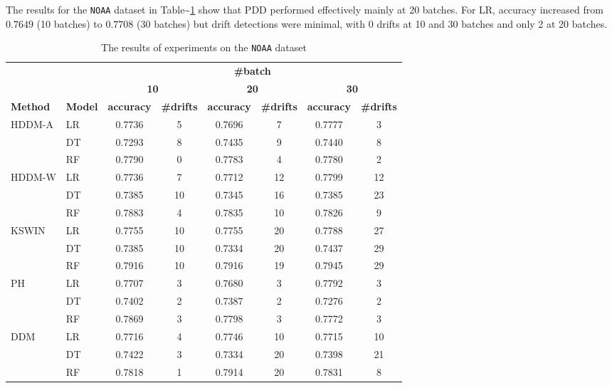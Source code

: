 The results for the \texttt{NOAA} dataset in Table\textasciitilde{}\ref{tab:exp_NOAA} show that PDD performed effectively mainly at 20 batches. For LR, accuracy increased from \(0.7649\) (10 batches) to \(0.7708\) (30 batches) but drift detections were minimal, with 0 drifts at 10 and 30 batches and only 2 at 20 batches.

\begin{table}[H]
    \centering
    \small
    \caption{The results of experiments on the \texttt{NOAA} dataset}
    \label{tab:exp_NOAA}
    \begin{tabular}{llcccccc}\toprule
        && \multicolumn{6}{c}{\textbf{\#batch}}\\\cmidrule(lr){3-8}
        && \multicolumn{2}{c}{\textbf{10}}    & \multicolumn{2}{c}{\textbf{20}} & \multicolumn{2}{c}{\textbf{30}} \\\cmidrule(lr){3-8}
        \textbf{Method} & \textbf{Model} & \textbf{accuracy} & \textbf{\#drifts} & \textbf{accuracy} & \textbf{\#drifts} & \textbf{accuracy} & \textbf{\#drifts} \\\midrule
        HDDM-A & LR & 0.7736 & 5 & 0.7696 & 7 & 0.7777 & 3 \\
        & DT & 0.7293 & 8 & 0.7435 & 9 & 0.7440 & 8 \\
        & RF & 0.7790 & 0 & 0.7783 & 4 & 0.7780 & 2 \\
        \midrule
        HDDM-W & LR & 0.7736 & 7 & 0.7712 & 12 & 0.7799 & 12 \\
        & DT & 0.7385 & 10 & 0.7345 & 16 & 0.7385 & 23 \\
        & RF & 0.7883 & 4 & 0.7835 & 10 & 0.7826 & 9 \\
        \midrule
        KSWIN & LR & 0.7755 & 10 & 0.7755 & 20 & 0.7788 & 27 \\
        & DT & 0.7385 & 10 & 0.7334 & 20 & 0.7437 & 29 \\
        & RF & 0.7916 & 10 & 0.7916 & 19 & 0.7945 & 29 \\
        \midrule
        PH & LR & 0.7707 & 3 & 0.7680 & 3 & 0.7792 & 3 \\
        & DT & 0.7402 & 2 & 0.7387 & 2 & 0.7276 & 2 \\
        & RF & 0.7869 & 3 & 0.7798 & 3 & 0.7772 & 3 \\
        \midrule
        DDM & LR & 0.7716 & 4 & 0.7746 & 10 & 0.7715 & 10 \\
        & DT & 0.7422 & 3 & 0.7334 & 20 & 0.7398 & 21 \\
        & RF & 0.7818 & 1 & 0.7914 & 20 & 0.7831 & 8 \\

\end{tabular}
\end{table}
